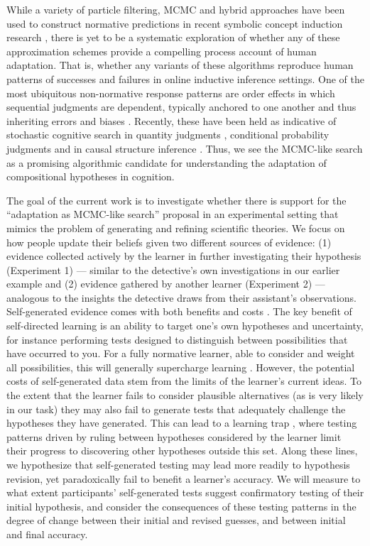 \documentclass[doc,natbib,floatsintext]{apa7}
\begin{document}
While a variety of particle filtering, MCMC and hybrid approaches have been used to construct normative predictions in recent symbolic concept induction research \citep{goodman2008rational, piantadosi2016logical, yang2022one}, there is yet to be a systematic exploration of whether any of these approximation schemes provide a compelling process account of human adaptation. That is, whether any variants of these algorithms reproduce human patterns of successes and failures in online inductive inference settings. One of the most ubiquitous non-normative response patterns are order effects in which sequential judgments are dependent, typically anchored to one another and thus inheriting errors and biases \citep{hogarth1992order}. Recently, these have been held as indicative of stochastic cognitive search in quantity judgments \citep{lieder2018anchoring}, conditional probability judgments \citep{dasgupta2017hypotheses} and in causal structure inference \citep{bramley2017formalizing}. Thus, we see the MCMC-like search as a promising algorithmic candidate for understanding the adaptation of compositional hypotheses in cognition. 

The goal of the current work is to investigate whether there is support for the ``adaptation as MCMC-like search'' proposal in an experimental setting that mimics the problem of generating and refining scientific theories. We focus on how people update their beliefs given two different sources of evidence: (1) evidence collected actively by the learner in further investigating their hypothesis (Experiment 1) --- similar to the detective's own investigations in our earlier example and (2) evidence gathered by another learner (Experiment 2) --- analogous to the insights the detective draws from their assistant's observations. Self-generated evidence comes with both benefits and costs \citep{markant2014better}. The key benefit of self-directed learning is an ability to target one's own hypotheses and uncertainty, for instance performing tests designed to distinguish between possibilities that have occurred to you. For a fully normative learner, able to consider and weight all possibilities, this will generally supercharge learning \citep{markant2014better}. However, the potential costs of self-generated data stem from the limits of the learner's current ideas. To the extent that the learner fails to consider plausible alternatives (as is very likely in our task) they may also fail to generate tests that adequately challenge the hypotheses they have generated. This can lead to a learning trap \citep{rich2018limits,settles2009active}, where testing patterns driven by ruling between hypotheses considered by the learner limit their progress to discovering other hypotheses outside this set. Along these lines, we hypothesize that self-generated testing may lead more readily to hypothesis revision, yet paradoxically fail to benefit a learner's accuracy. We will measure to what extent participants' self-generated tests suggest confirmatory testing of their initial hypothesis, and consider the consequences of these testing patterns in the degree of change between their initial and revised guesses, and between initial and final accuracy.
\end{document}
